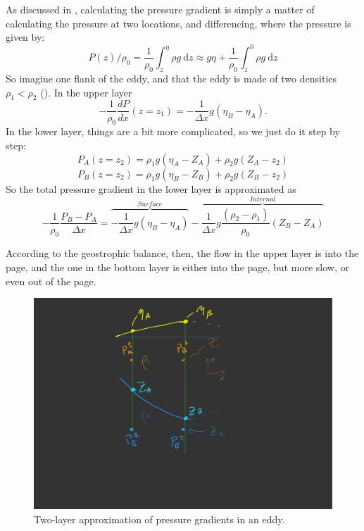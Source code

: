 As discussed in , calculating the pressure gradient is simply a matter of calculating the pressure at two locations, and differencing, where the pressure is given by:
\begin{equation}
  P(z) / \rho_0 = \frac{1}{\rho_0}\int_z^\eta \rho g\ \mathrm{d}z \approx g\eta + \frac{1}{\rho_0}\int_z^0 \rho g\ \mathrm{d}z
\end{equation}
So imagine one flank of the eddy, and that the eddy is made of two densities $\rho_1 < \rho_2$ ().  In the upper layer 
\begin{equation}
  -\frac{1}{\rho_0} \frac{dP}{dx}(z=z_1) = -\frac{1}{\Delta x} g (\eta_B - \eta_A).
\end{equation}
In the lower layer, things are a bit more complicated, so we just do it step by step:
\begin{equation}
  P_A(z=z_2) = \rho_1 g (\eta_A - Z_A) + \rho_2 g (Z_A - z_2)
\end{equation}
\begin{equation}
  P_B(z=z_2) = \rho_1 g (\eta_B - Z_B) + \rho_2 g (Z_B - z_2)
\end{equation}
So the total pressure gradient in the lower layer is approximated as 
\begin{equation}
  -\frac{1}{\rho_0}\frac{P_B - P_A}{\Delta x} = \overbrace{-\frac{1}{\Delta x} g (\eta_B - \eta_A)}^{Surface} - \overbrace{\frac{1}{\Delta x} g \frac{\left(\rho_2 - \rho_1\right)}{\rho_0} (Z_B - Z_A)}^{Internal}
  \label{eq:InternalExternal}
\end{equation}

According to the geostrophic balance, then, the flow in the upper layer is into the page, and the one in the bottom layer is either into the page, but more slow, or even out of the page.  

\begin{figure}[hbt]
  \begin{center}
    \includegraphics{figs/Geostrophic/CounterPressure}
    \caption{Two-layer approximation of pressure gradients in an eddy.}
    \label{fig:CounterPressure}  
  \end{center}
\end{figure}

